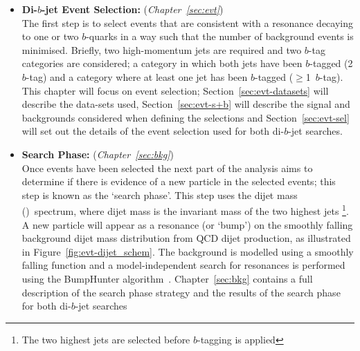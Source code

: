\begin{itemize}[leftmargin=*]
\item\textbf{Di-$b$-jet Event Selection:} (\textit{Chapter~\ref{sec:evt}})\\
  The first step is to select events that are consistent with a resonance decaying to one or two $b$-quarks
  in a way such that the number of background events is minimised.
  Briefly, two high-momentum jets are required and two $b$-tag categories are considered;
  a category in which both jets have been $b$-tagged (2 $b$-tag) and a category where at least one jet has been $b$-tagged ($\geq$1~$b$-tag).
  This chapter will focus on event selection;
  Section~\ref{sec:evt-datasets} will describe the data-sets used,
  Section~\ref{sec:evt-s+b} will describe the signal and backgrounds
  considered when defining the selections
  and Section~\ref{sec:evt-sel} will set out
  the details of the event selection used for both di-$b$-jet searches.  \vspace{0.8em}

  \vfill \newpage
\item\textbf{Search Phase:} (\textit{Chapter~\ref{sec:bkg}})\\
  Once events have been selected the next part of the analysis aims to determine if there
  is evidence of a new particle in the selected events; this step is known as the `search phase'.
  This step uses the dijet mass (\mjj)~spectrum, where dijet mass is the invariant mass of the two highest \pT{} jets
  \footnote{The two highest \pT{} jets are selected before $b$-tagging is applied}.
  A new particle will appear as a resonance (or `bump') on the smoothly falling background
  dijet mass distribution from QCD dijet production, as illustrated in Figure~\ref{fig:evt-dijet_schem}.
  The background is modelled using a smoothly falling function and a
  model-independent search for resonances is performed using the {\sc BumpHunter} algorithm~\cite{dibjet-bh}.
  Chapter~\ref{sec:bkg} contains a full description of the search phase strategy and the results of the search phase for both di-$b$-jet searches
 

\end{itemize}
